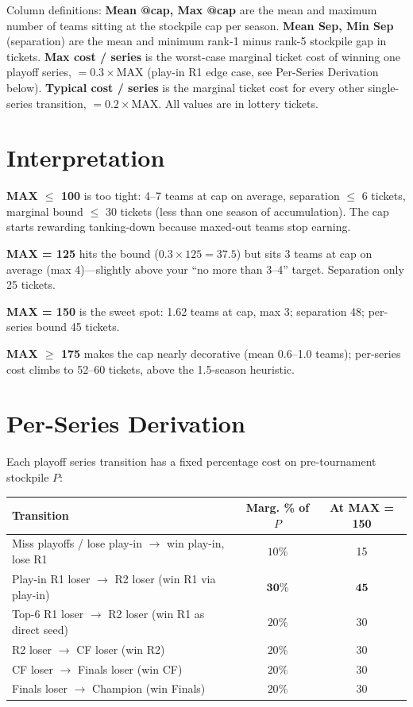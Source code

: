 \documentclass[10pt,letterpaper]{article}
\begin{document}
{\footnotesize
Column definitions: \textbf{Mean @cap, Max @cap} are the mean and maximum number of teams sitting at the stockpile cap per season. \textbf{Mean Sep, Min Sep} (separation) are the mean and minimum rank-1 minus rank-5 stockpile gap in tickets. \textbf{Max cost / series} is the worst-case marginal ticket cost of winning one playoff series, $= 0.3 \times \text{MAX}$ (play-in R1 edge case, see Per-Series Derivation below). \textbf{Typical cost / series} is the marginal ticket cost for every other single-series transition, $= 0.2 \times \text{MAX}$. All values are in lottery tickets.
}

\section*{Interpretation}

\textbf{MAX $\leq$ 100} is too tight: 4--7 teams at cap on average, separation $\leq$ 6 tickets, marginal bound $\leq$ 30 tickets (less than one season of accumulation). The cap starts rewarding tanking-down because maxed-out teams stop earning.

\textbf{MAX = 125} hits the bound ($0.3 \times 125 = 37.5$) but sits 3 teams at cap on average (max 4)---slightly above your ``no more than 3--4'' target. Separation only 25 tickets.

\textbf{MAX = 150} is the sweet spot: 1.62 teams at cap, max 3; separation 48; per-series bound 45 tickets.

\textbf{MAX $\geq$ 175} makes the cap nearly decorative (mean 0.6--1.0 teams); per-series cost climbs to 52--60 tickets, above the 1.5-season heuristic.

\section*{Per-Series Derivation}

Each playoff series transition has a fixed percentage cost on pre-tournament stockpile $P$:

\begin{center}
\small
\begin{tabular}{l|c|c}
\toprule
\textbf{Transition} & \textbf{Marg. \% of $P$} & \textbf{At MAX = 150} \\
\midrule
Miss playoffs / lose play-in $\to$ win play-in, lose R1 & $10\%$ & 15 \\
\rowcolor{yellow!18}
Play-in R1 loser $\to$ R2 loser (win R1 via play-in) & $\mathbf{30\%}$ & $\mathbf{45}$ \\
Top-6 R1 loser $\to$ R2 loser (win R1 as direct seed) & $20\%$ & 30 \\
R2 loser $\to$ CF loser (win R2) & $20\%$ & 30 \\
CF loser $\to$ Finals loser (win CF) & $20\%$ & 30 \\
Finals loser $\to$ Champion (win Finals) & $20\%$ & 30 \\
\bottomrule
\end{tabular}
\end{center}
\end{document}
